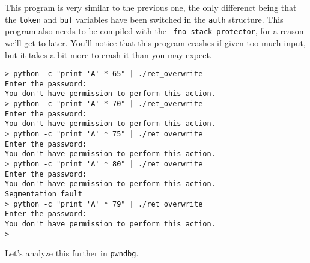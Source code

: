\documentclass{article}
\begin{document}
This program is very similar to the previous one, the only differenct being that
the \texttt{token} and \texttt{buf} variables have been switched in the
\texttt{auth} structure. This program also needs to be compiled with the
\texttt{-fno-stack-protector}, for a reason we'll get to later. You'll notice
that this program crashes if given too much input, but it takes a bit more to
crash it than you may expect.

\begin{lstlisting}
> python -c "print 'A' * 65" | ./ret_overwrite 
Enter the password:
You don't have permission to perform this action.
> python -c "print 'A' * 70" | ./ret_overwrite 
Enter the password:
You don't have permission to perform this action.
> python -c "print 'A' * 75" | ./ret_overwrite 
Enter the password:
You don't have permission to perform this action.
> python -c "print 'A' * 80" | ./ret_overwrite 
Enter the password:
You don't have permission to perform this action.
Segmentation fault
> python -c "print 'A' * 79" | ./ret_overwrite 
Enter the password:
You don't have permission to perform this action.
> 
\end{lstlisting}

Let's analyze this further in \texttt{pwndbg}.
\end{document}
